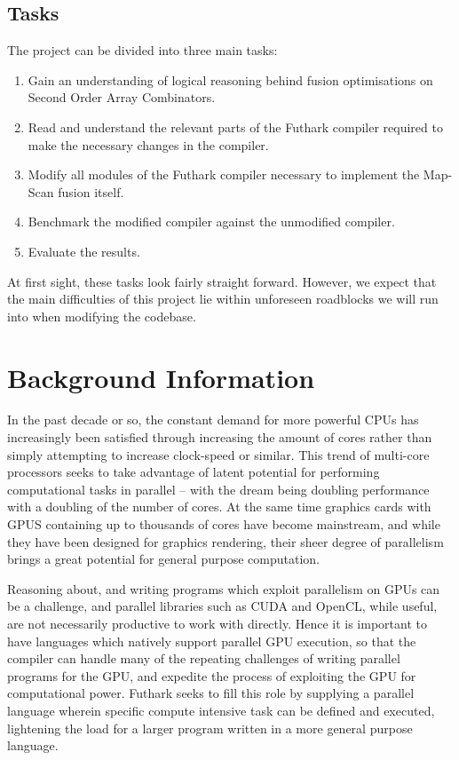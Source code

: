 \documentclass[11pt]{article}
\begin{document}
\subsection{Tasks}
The project can be divided into three main tasks:
\begin{enumerate}
    \item Gain an understanding of logical reasoning behind fusion optimisations on Second Order Array Combinators.
    \item Read and understand the relevant parts of the Futhark compiler required to make the necessary changes in the compiler.
    \item Modify all modules of the Futhark compiler necessary to implement the Map-Scan fusion itself.
    \item Benchmark the modified compiler against the unmodified compiler.
    \item Evaluate the results.
\end{enumerate}
At first sight, these tasks look fairly straight forward. However, we expect that the main difficulties of this project lie within unforeseen roadblocks we will run into when modifying the codebase.

\section{Background Information}
In the past decade or so, the constant demand for more powerful CPUs has increasingly been satisfied through increasing the amount of cores rather than simply attempting to increase clock-speed or similar.
 This trend of multi-core processors seeks to take advantage of latent potential for performing computational tasks in parallel -- with the dream being doubling performance with a doubling of the
 number of cores. At the same time graphics cards with GPUS containing up to thousands of cores have become mainstream, and while they have been designed for graphics rendering, their sheer degree of 
parallelism brings a great potential for general purpose computation. 

Reasoning about, and writing programs which exploit parallelism on GPUs can be a challenge, and parallel libraries such as CUDA and OpenCL, while useful, are not necessarily productive to work with directly.
 Hence it is important to have languages which natively support parallel GPU execution, so that the compiler can handle many of the repeating challenges of writing parallel programs for the GPU, and 
 expedite the process of exploiting the GPU for computational power. Futhark seeks to fill this role by supplying a parallel language wherein specific compute intensive task can be defined and executed,
 lightening the load for a larger program written in a more general purpose language. \cite{futharklang} 
\end{document}
